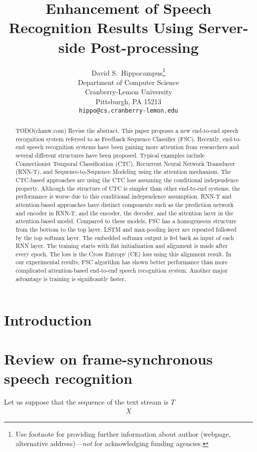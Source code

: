\documentclass{article}
\title{Enhancement of Speech Recognition Results Using Server-side
Post-processing}
\author{
  David S.~Hippocampus\thanks{Use footnote for providing further
    information about author (webpage, alternative
    address)---\emph{not} for acknowledging funding agencies.} \\
  Department of Computer Science\\
  Cranberry-Lemon University\\
  Pittsburgh, PA 15213 \\
  \texttt{hippo@cs.cranberry-lemon.edu} \\
}
\begin{document}

\maketitle

\begin{abstract}
TODO(chanw.com) Revise the abstract.
This paper proposes a new end-to-end speech recognition system referred to
as Feedback Sequence Classifier (FSC). Recently, end-to-end speech
recognition systems have been gaining more attention from researchers and
several different structures have been proposed. Typical examples  
include Connectionist Temporal Classification (CTC), Recurrent Neural Network
  Transducer (RNN-T), and Sequence-to-Sequence Modeling using the attention
mechanism. The CTC-based approaches are using the CTC loss assuming the
conditional independence property. Although the structure of CTC is simpler
than other end-to-end systems, the performance is worse due to this conditional
independence assumption. RNN-T and attention-based approaches have distinct
components such as the prediction network  and encoder in RNN-T, and
the encoder, the decoder, and the attention layer in the attention-based model.
Compared to these models, FSC has a homogeneous structure from the bottom to 
the top layer. LSTM and max-pooling layer are repeated followed by the top
softmax layer. The embedded softmax output is fed back as input of each RNN
layer. The training starts with flat initialization and alignment is made
after every epoch. The loss is the Cross Entropy (CE) loss using this 
alignment result. In our experimental results, FSC algorithm has shown 
better performance than more complicated attention-based end-to-end speech
recognition system. Another major advantage is training is significantly
faster.
\end{abstract}

\section{Introduction}


\section{Review on frame-synchronous speech recognition}

Let us suppose that the sequence of the text stream is $T$  
\begin{align}
  X
\end{align}
\end{document}
